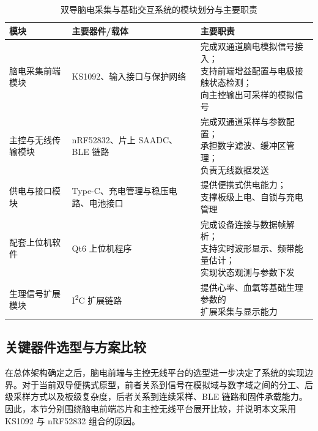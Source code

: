 \begin{table}[htbp]
    \centering
    \caption{双导脑电采集与基础交互系统的模块划分与主要职责}
    \label{tab:c3_module_split}
    \begingroup
    \renewcommand{\arraystretch}{1.18}
    \setlength{\tabcolsep}{4pt}
    \begin{tabular}{@{}>{\raggedright\arraybackslash}p{2.8cm}>{\raggedright\arraybackslash}p{3.0cm}>{\raggedright\arraybackslash}p{7.4cm}@{}}
        \toprule[1.5pt]
        模块 & 主要器件/载体 & 主要职责 \\
        \midrule[1pt]
        脑电采集前端模块 & KS1092、输入接口与保护网络 & \makecell[tl]{完成双通道脑电模拟信号接入；\\支持前端增益配置与电极接触状态检测；\\向主控输出可采样的模拟信号} \\
        主控与无线传输模块 & nRF52832、片上 SAADC、BLE 链路 & \makecell[tl]{完成双通道采样与参数配置；\\承担数字滤波、缓冲区管理；\\负责无线数据发送} \\
        供电与接口模块 & Type-C、充电管理与稳压电路、电池接口 & \makecell[tl]{提供便携式供电能力；\\支撑板级上电、自锁与充电管理} \\
        配套上位机软件 & Qt6 上位机程序 & \makecell[tl]{完成设备连接与数据帧解析；\\支持实时波形显示、频带能量估计；\\实现状态观测与参数下发} \\
        生理信号扩展模块 & I\textsuperscript{2}C 扩展链路 & \makecell[tl]{提供心率、血氧等基础生理参数的\\扩展采集与显示能力} \\
        \bottomrule[1.5pt]
    \end{tabular}
    \endgroup
\end{table}

\subsection{关键器件选型与方案比较}

在总体架构确定之后，脑电前端与主控无线平台的选型进一步决定了系统的实现边界。对于当前双导便携式原型，前者关系到信号在模拟域与数字域之间的分工、后级采样方式以及板级复杂度，后者关系到连续采样、BLE 链路和固件承载能力。因此，本节分别围绕脑电前端芯片和主控无线平台展开比较，并说明本文采用 KS1092 与 nRF52832 组合的原因。

